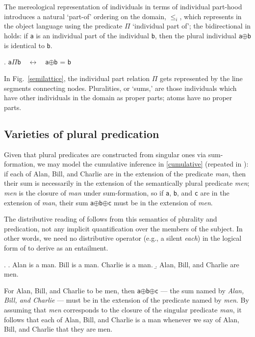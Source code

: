 \documentclass[linguex]{sp}
\renewcommand{\tt}{\texttt}
\newcommand{\op}{$\oplus$}
\begin{document}
\noindent 

The mereological representation of individuals in terms of individual part-hood introduces a natural `part-of' ordering on the domain, $\leq_{i}$, which \citeauthor{link1983} represents in the object language using the predicate $\Pi$ `individual part of'; the bidirectional in \Next holds: if \tt{a} is an individual part of the individual \tt{b}, then the plural individual \tt{a}\op\tt{b} is identical to \tt{b}.

\ex. \tt{a}$\Pi$\tt{b}\ \ $\leftrightarrow$\ \ \tt{a}\op\tt{b} = \tt{b}

In Fig.\ \ref{semilattice}, the individual part relation $\Pi$ gets represented by the line segments connecting nodes. Pluralities, or `sums,' are those individuals which have other individuals in the domain as proper parts; atoms have no proper parts.

\subsection{Varieties of plural predication}

Given that plural predicates are constructed from singular ones via sum-formation, we may model the cumulative inference in \ref{cumulative} (repeated in \Next): if each of Alan, Bill, and Charlie are in the extension of the predicate \emph{man}, then their sum is necessarily in the extension of the semantically plural predicate \emph{men}; \emph{men} is the closure of \emph{man} under sum-formation, so if \tt{a}, \tt{b}, and \tt{c} are in the extension of \emph{man}, their sum \tt{a}\op\tt{b}\op\tt{c} must be in the extension of \emph{men}.

The distributive reading of \Next[b] follows from this semantics of plurality and predication, not any implicit quantification over the members of the subject. In other words, we need no  distributive operator (e.g., a silent \emph{each}) in the logical form of \Next[b] to derive \Next[a] as an entailment.

\ex. \a. Alan is a man. Bill is a man. Charlie is a man.
\b. Alan, Bill, and Charlie are men.

For Alan, Bill, and Charlie to be men, then \tt{a}\op\tt{b}\op\tt{c} --- the sum named by \emph{Alan, Bill, and Charlie} --- must be in the extension of the predicate named by \emph{men}. By assuming that \emph{men} corresponds to the closure of the singular predicate \emph{man}, it follows that each of Alan, Bill, and Charlie is a man whenever we say of Alan, Bill, and Charlie that they are men.
\end{document}
